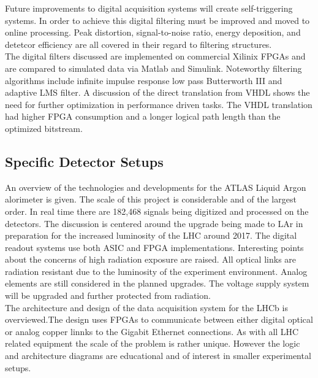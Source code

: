 \documentclass[12pt]{article}
\begin{document}
{\large\textbf{\cite{Alberto200999}}}
Future improvements to digital acquisition systems will create self-triggering systems. In order to achieve this digital filtering must be improved and moved to online processing. Peak distortion, signal-to-noise ratio, energy deposition, and detetcor efficiency are all covered in their regard to filtering structures.
\\
The digital filters discussed are implemented on commercial Xilinix FPGAs and are compared to simulated data via Matlab and Simulink. Noteworthy filtering algorithms include infinite impulse response low pass Butterworth III and adaptive LMS filter. A discussion of the direct translation from VHDL shows the need for further optimization in performance driven tasks. The VHDL translation had higher FPGA consumption and a longer logical path length than the optimized bitstream.
\\[20pt]


\subsection{Specific Detector Setups}

{\large\textbf{\cite{Chen2010261}}}
An overview of the technologies and developments for the ATLAS Liquid Argon alorimeter is given. The scale of this project is considerable and of the largest order. In real time there are 182,468 signals being digitized and processed on the detectors. The discussion is centered around the upgrade being made to LAr in preparation for the increased luminosity of the LHC around 2017. The digital readout systems use both ASIC and FPGA implementations.
Interesting points about the concerns of high radiation exposure are raised. All optical links are radiation resistant due to the luminosity of the experiment environment. Analog elements are still considered in the planned upgrades. The voltage supply system will be upgraded and further protected from radiation.
 \\[20pt]


{\large\textbf{\cite{Haefeli2006119}}}
The architecture and design of the data acquisition system for the LHCb is overviewed.The design uses FPGAs to communicate between either digital optical or analog copper linnks to the Gigabit Ethernet connections. As with all LHC related equipment the scale of the problem is rather unique. However the logic and architecture diagrams are educational and of interest in smaller experimental setups.
\\[20pt]
\end{document}
